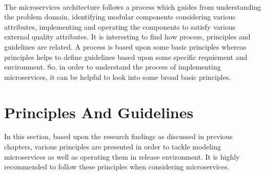 \\
The microservices architecture follows a process which guides from understanding the problem domain, identifying modular components considering various attributes, implementing and operating the components to satisfy various external quality attributes. It is interesting to find how process, principles and guidelines are related. A process is based upon some basic principles whereas principles helps to define guidelines based upon some specific requiement and environment. So, in order to understand the process of implementing microservices, it can be helpful to look into some broad basic principles.

\section{Principles And Guidelines}\label{section:guidelines/principles_and_guidelines}
In this section, based upon the research findings as discussed in previous chapters, various principles are presented in order to tackle modeling microservices as well as operating them in release environment. It is highly recommended to follow these principles when considering microservices.\cite{Newman:2015aa}
